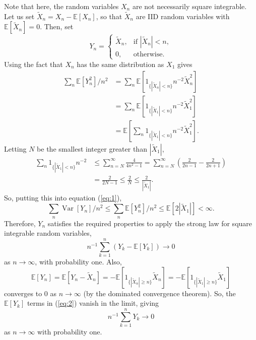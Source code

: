 \documentclass[12pt]{article}
\begin{document}
Note that here, the random variables $X_n$ are not necessarily square integrable. Let us set $\tilde X_n=X_n-\mathbb{E}[X_n]$, so that $\tilde X_n$ are IID random variables with $\mathbb{E}[\tilde X_n]=0$. Then, set
\begin{equation*}
Y_n=\left\{
\begin{array}{ll}
\tilde X_n,&\textrm{if }\left|\tilde X_n\right|<n,\\
0,&\textrm{otherwise}.
\end{array}
\right.
\end{equation*}
Using the fact that $X_n$ has the same distribution as $X_1$ gives
\begin{equation}\label{eq:1}\begin{split}
\sum_n\mathbb{E}[Y_n^2]/n^2
&= \sum_n\mathbb{E}\left[1_{\{|\tilde X_n|<n\}}n^{-2}\tilde X_n^2\right]\\
&= \sum_n\mathbb{E}\left[1_{\{|\tilde X_1|<n\}}n^{-2}\tilde X_1^2\right]\\
&= \mathbb{E}\left[\sum_n1_{\{|\tilde X_1|<n\}}n^{-2}\tilde X_1^2\right].
\end{split}\end{equation}
Letting $N$ be the smallest integer greater than $|\tilde X_1|$,
\begin{equation*}\begin{split}
\sum_n1_{\{|\tilde X_1|<n\}}n^{-2}&\le\sum_{n=N}^\infty\frac{4}{4n^2-1}=\sum_{n=N}^\infty\left(\frac{2}{2n-1}-\frac{2}{2n+1}\right)\\
&=\frac{2}{2N-1}\le\frac{2}{N}\le\frac{2}{|\tilde X_1|}.
\end{split}\end{equation*}
So, putting this into equation (\ref{eq:1}),
\begin{equation*}
\sum_n\operatorname{Var}[Y_n]/n^2\le\sum_n\mathbb{E}[Y_n^2]/n^2\le\mathbb{E}[2|\tilde X_1|]<\infty.
\end{equation*}
Therefore, $Y_n$ satisfies the required properties to apply the strong law for square integrable random variables,
\begin{equation}\label{eq:2}
n^{-1}\sum_{k=1}^n(Y_k-\mathbb{E}[Y_k])\rightarrow 0
\end{equation}
as $n\rightarrow\infty$, with probability one. Also,
\begin{equation*}
\mathbb{E}[Y_n]=\mathbb{E}[Y_n-\tilde X_n]=-\mathbb{E}[1_{\{|\tilde X_n|\ge n\}}\tilde X_n]=-\mathbb{E}[1_{\{|\tilde X_1|\ge n\}}\tilde X_1]
\end{equation*}
converges to $0$ as $n\rightarrow\infty$ (by the dominated convergence theorem). So, the $\mathbb{E}[Y_k]$ terms in (\ref{eq:2}) vanish in the limit, giving
\begin{equation}\label{eq:3}
n^{-1}\sum_{k=1}^nY_k\rightarrow 0
\end{equation}
as $n\rightarrow\infty$ with probability one.
\end{document}
